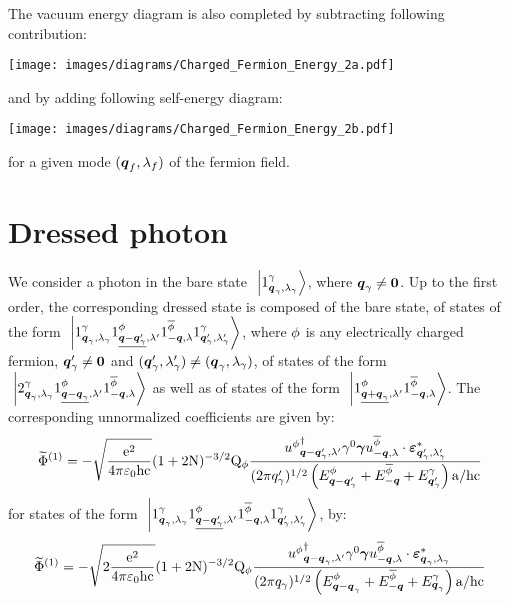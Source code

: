 The vacuum energy diagram is also completed by subtracting following contribution:
\begin{center}
\texttt{[image: images/diagrams/Charged\_Fermion\_Energy\_2a.pdf]}
\end{center}
and by adding following self-energy diagram:
\begin{center}
\texttt{[image: images/diagrams/Charged\_Fermion\_Energy\_2b.pdf]}
\end{center}
for a given mode $(\boldsymbol{q}_f, \lambda_f)$ of the fermion field.

\section{Dressed photon}

We consider a photon in the bare state $\ \left|{{1}^{\gamma}_{{\boldsymbol{q}_ \gamma}, {\lambda_ \gamma}}}\right\rangle$, where $\boldsymbol{q}_\gamma \neq \boldsymbol{0}$. Up to the first order, the corresponding dressed state is composed of the bare state, of states of the form $\ \left|{{1}^{\gamma}_{{\boldsymbol{q}_ \gamma}, {\lambda_ \gamma}} {1}^{\phi}_{{\underline{\boldsymbol{q}-\boldsymbol{q}_\gamma'}}, {\lambda'}} {1}^{\overline{\phi}}_{{-\boldsymbol{q}}, {\lambda}} {1}^{\gamma}_{{\boldsymbol{q}_\gamma'}, {\lambda_\gamma'}}}\right\rangle$, where $\phi$ is any electrically charged fermion, $\boldsymbol{q}_\gamma' \neq \boldsymbol{0}$ and $(\boldsymbol{q}_\gamma',\lambda_\gamma') \neq (\boldsymbol{q}_ \gamma,\lambda_ \gamma)$, of states of the form $\ \left|{{2}^{\gamma}_{{\boldsymbol{q}_ \gamma}, {\lambda_ \gamma}} {1}^{\phi}_{{\underline{\boldsymbol{q}-\boldsymbol{q}_\gamma}}, {\lambda'}} {1}^{\overline{\phi}}_{{-\boldsymbol{q}}, {\lambda}}}\right\rangle$ as well as of states of the form $\ \left|{{1}^{\phi}_{{\underline{\boldsymbol{q} + \boldsymbol{q}_\gamma}}, {\lambda'}} {1}^{\overline{\phi}}_{{-\boldsymbol{q}}, {\lambda}}}\right\rangle$. The corresponding unnormalized coefficients  are given by:
\begin{equation*}
\widetilde{\Phi}^{(1)} = - \sqrt{\frac{\mathrm e^2}{4 \pi \mathrm \varepsilon_0 \mathrm h \mathrm c}} ( 1 + 2 \mathrm N )^{-3/2} \mathrm Q_{\phi} \frac{{u^{\phi}}^{\dagger}_{{\boldsymbol{q} - \boldsymbol{q}_\gamma'}, {\lambda'}} \gamma^{0} \boldsymbol{\gamma} u^{\overline{\phi}}_{{-\boldsymbol{q}}, {\lambda}} \cdot \boldsymbol{\varepsilon}_{{\boldsymbol{q}_\gamma'},{\lambda_\gamma'}}^*}{( 2 \pi q_\gamma' )^{1 / 2} \left( E^{\phi}_{\boldsymbol{q} - \boldsymbol{q}_\gamma'} + E^{\overline{\phi}}_{-\boldsymbol{q}} + E^{\gamma}_{\boldsymbol{q}_\gamma'} \right) \mathrm a / \mathrm h \mathrm c}
\end{equation*}
for states of the form $\ \left|{{1}^{\gamma}_{{\boldsymbol{q}_ \gamma}, {\lambda_ \gamma}} {1}^{\phi}_{{\underline{\boldsymbol{q}-\boldsymbol{q}_\gamma'}}, {\lambda'}} {1}^{\overline{\phi}}_{{-\boldsymbol{q}}, {\lambda}} {1}^{\gamma}_{{\boldsymbol{q}_\gamma'}, {\lambda_\gamma'}}}\right\rangle$, by:
\begin{equation*}
\widetilde{\Phi}^{(1)} = - \sqrt{2 \frac{\mathrm e^2}{4 \pi \mathrm \varepsilon_0 \mathrm h \mathrm c}} ( 1 + 2 \mathrm N )^{-3/2} \mathrm Q_{\phi} \frac{{u^{\phi}}^{\dagger}_{{\boldsymbol{q} - \boldsymbol{q}_\gamma}, {\lambda'}} \gamma^{0} \boldsymbol{\gamma} u^{\overline{\phi}}_{{-\boldsymbol{q}}, {\lambda}} \cdot \boldsymbol{\varepsilon}_{{\boldsymbol{q}_\gamma},{\lambda_\gamma}}^*}{( 2 \pi q_\gamma )^{1 / 2} \left( E^{\phi}_{\boldsymbol{q} - \boldsymbol{q}_\gamma} + E^{\overline{\phi}}_{-\boldsymbol{q}} + E^{\gamma}_{\boldsymbol{q}_\gamma} \right) \mathrm a / \mathrm h \mathrm c}
\end{equation*}
